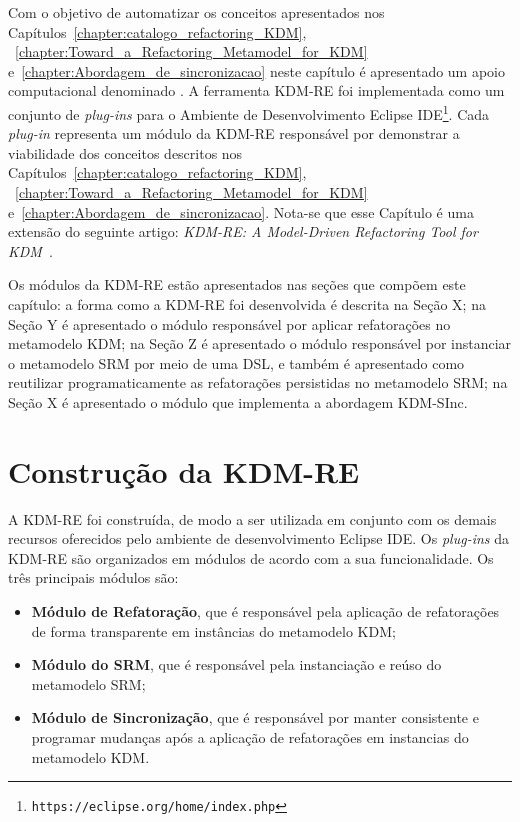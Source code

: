 Com o objetivo de automatizar os conceitos apresentados nos Capítulos~\ref{chapter:catalogo_refactoring_KDM}, ~\ref{chapter:Toward_a_Refactoring_Metamodel_for_KDM} e~\ref{chapter:Abordagem_de_sincronizacao} neste capítulo é apresentado um apoio computacional denominado . A ferramenta KDM-RE foi implementada como um conjunto de \textit{plug-ins} para o Ambiente de Desenvolvimento Eclipse IDE\footnote{\texttt{https://eclipse.org/home/index.php}}. Cada \textit{plug-in} representa um módulo da KDM-RE responsável por demonstrar a viabilidade dos conceitos descritos nos Capítulos~\ref{chapter:catalogo_refactoring_KDM}, ~\ref{chapter:Toward_a_Refactoring_Metamodel_for_KDM} e~\ref{chapter:Abordagem_de_sincronizacao}.  Nota-se que esse Capítulo é uma extensão do seguinte artigo: \textit{KDM-RE: A Model-Driven Refactoring Tool for KDM}~\cite{durelli_VEM_ferramenta}.

Os módulos da KDM-RE estão apresentados nas seções que compõem este capítulo: a forma como a KDM-RE foi desenvolvida é descrita na Seção X; na Seção Y é apresentado o módulo responsável por aplicar refatorações no metamodelo KDM; na Seção Z é apresentado o módulo responsável por instanciar o metamodelo SRM por meio de uma DSL, e também é apresentado como reutilizar programaticamente as refatorações persistidas no metamodelo SRM; na Seção X é apresentado o módulo que implementa a abordagem KDM-SInc.



\section{Construção da KDM-RE}\label{sec:construcao_da_kdm_re}

A KDM-RE foi construída, de modo a ser utilizada em conjunto com os demais recursos oferecidos pelo ambiente de desenvolvimento Eclipse IDE. Os \textit{plug-ins} da KDM-RE são organizados em módulos de acordo com a sua funcionalidade. Os três principais módulos são:

\begin{itemize}
\item \textbf{Módulo de Refatoração}, que é responsável pela aplicação de refatorações de forma transparente em instâncias do metamodelo KDM;

\item \textbf{Módulo do SRM}, que é responsável pela instanciação e reúso do metamodelo SRM;

\item \textbf{Módulo de Sincronização}, que é responsável por manter consistente e programar mudanças após a aplicação de refatorações em instancias do metamodelo KDM.

\end{itemize}

